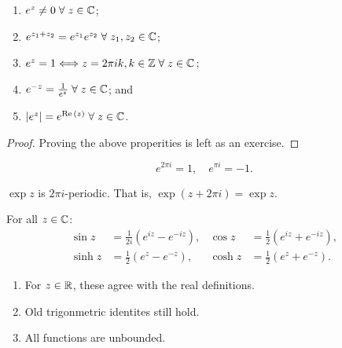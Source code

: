 \begin{proposition}
    \hspace{0em}
    \begin{enumerate}
        \item $e^z \neq 0 \; \forall \; z \in \mathbb{C}$;
        \item $e^{z_1 + z_2} = e^{z_1}e^{z_2} \; \forall \; z_1, z_2 \in \mathbb{C}$;
        \item $e^z = 1 \Longleftrightarrow z = 2\pi i k, k \in \mathbb{Z} \; \forall \; z \in \mathbb{C}$;
        \item $e^{-z} = \frac{1}{e^z} \; \forall \; z \in \mathbb{C}$; and
        \item $\lvert e^z \rvert = e^{\operatorname{Re}{(z)}} \; \forall \; z \in \mathbb{C}$.
    \end{enumerate}
\end{proposition}

\begin{proof}
   Proving the above properities is left as an exercise.
\end{proof}

\begin{lemma}
    \[ e^{2\pi i}=1, \quad e^{\pi i}=-1. \]
\end{lemma}

\begin{lemma}
    $\exp{z}$ is $2\pi i$-periodic. That is, $\exp{(z + 2\pi i)} = \exp{z}$.
\end{lemma}

\begin{definition}
   For all $z \in \mathbb{C}$:
   \begin{align*}
       \sin{z} &= \frac{1}{2i} (e^{iz} - e^{-iz}), & \cos{z} &= \frac12(e^{iz} + e^{-iz}), \\
       \sinh{z} &= \frac12(e^z - e^{-z}), & \cosh{z} &= \frac12(e^z + e^{-z}).
   \end{align*}
\end{definition}

\begin{remark}
    \hspace{0em}
    \begin{enumerate}
        \item For $z \in \mathbb{R}$, these agree with the real definitions.
        \item Old trigonmetric identites still hold.
        \item All functions are unbounded.
    \end{enumerate}
\end{remark}

